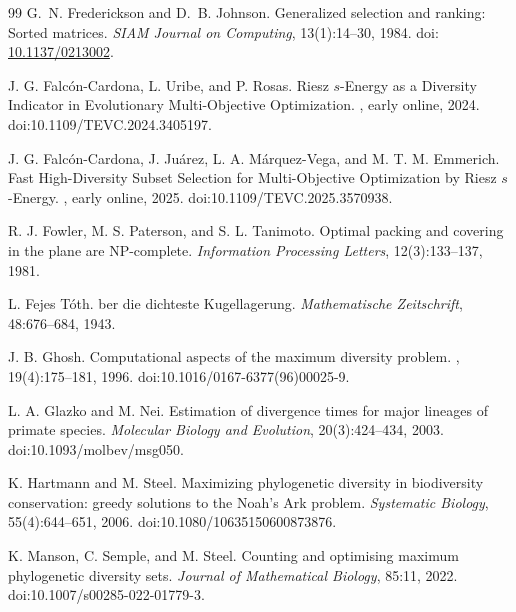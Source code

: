 \documentclass[11pt]{article}
\begin{document}
\begin{thebibliography}{99}
G.~N. Frederickson and D.~B. Johnson.
\newblock Generalized selection and ranking: Sorted matrices.
\newblock \emph{SIAM Journal on Computing}, 13(1):14--30, 1984.
\newblock doi: \href{https://doi.org/10.1137/0213002}{10.1137/0213002}.

J. G. Falcón-Cardona, L. Uribe, and P. Rosas.
\newblock Riesz $s$-Energy as a Diversity Indicator in Evolutionary Multi-Objective Optimization.
, early online, 2024.
\newblock doi:10.1109/TEVC.2024.3405197.

J. G. Falcón-Cardona, J. Juárez, L. A. Márquez-Vega, and M. T. M. Emmerich.
\newblock Fast High-Diversity Subset Selection for Multi-Objective Optimization by Riesz $s$-Energy.
, early online, 2025.
\newblock doi:10.1109/TEVC.2025.3570938.

R. J. Fowler, M. S. Paterson, and S. L. Tanimoto.
\newblock Optimal packing and covering in the plane are NP-complete.
\newblock \emph{Information Processing Letters}, 12(3):133--137, 1981.

L. Fejes T\'oth.
ber die dichteste Kugellagerung.
\newblock \emph{Mathematische Zeitschrift}, 48:676--684, 1943.

J. B. Ghosh.
\newblock Computational aspects of the maximum diversity problem.
, 19(4):175--181, 1996.
\newblock doi:10.1016/0167-6377(96)00025-9.

L. A. Glazko and M. Nei.
\newblock Estimation of divergence times for major lineages of primate species.
\newblock \emph{Molecular Biology and Evolution}, 20(3):424--434, 2003.
\newblock doi:10.1093/molbev/msg050.

K. Hartmann and M. Steel.
\newblock Maximizing phylogenetic diversity in biodiversity conservation: greedy solutions to the Noah's Ark problem.
\newblock \emph{Systematic Biology}, 55(4):644--651, 2006.
\newblock doi:10.1080/10635150600873876.

K. Manson, C. Semple, and M. Steel.
Counting and optimising maximum phylogenetic diversity sets.
\emph{Journal of Mathematical Biology}, 85:11, 2022.
doi:10.1007/s00285-022-01779-3.



\end{thebibliography}
\end{document}
